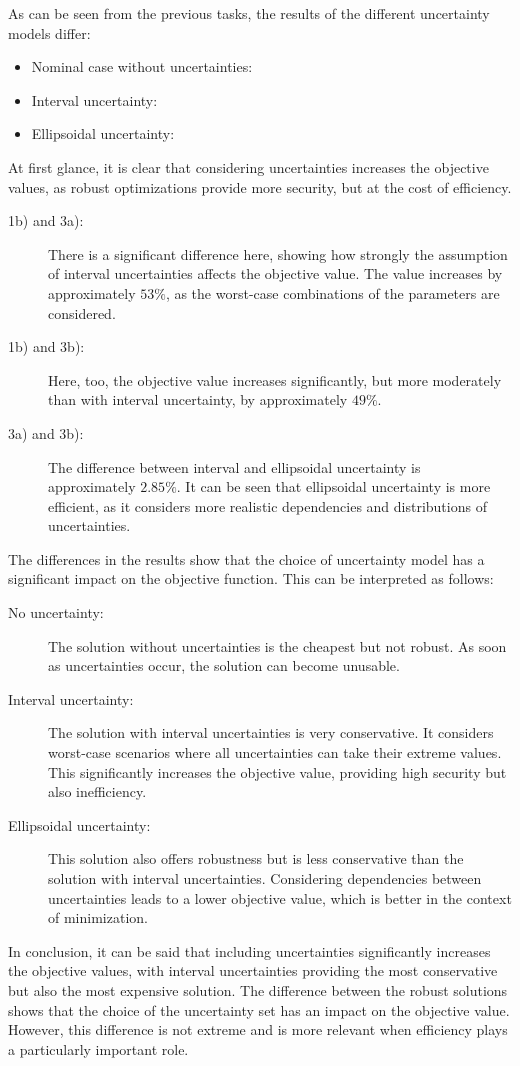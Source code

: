 \documentclass[a4paper,12pt]{article}
\begin{document}
As can be seen from the previous tasks, the results of the different uncertainty models differ:
\begin{itemize}
    \item Nominal case without uncertainties: 
    \item Interval uncertainty: 
    \item Ellipsoidal uncertainty: 
\end{itemize}
At first glance, it is clear that considering uncertainties increases the objective values, as robust optimizations provide more security, but at the cost of efficiency.
\begin{description}
    \item[1b) and 3a):] There is a significant difference here, showing how strongly the assumption of interval uncertainties affects the objective value. The value increases by approximately $53\%$, as the worst-case combinations of the parameters are considered.
    \item[1b) and 3b):] Here, too, the objective value increases significantly, but more moderately than with interval uncertainty, by approximately $49\%$.
    \item[3a) and 3b):] The difference between interval and ellipsoidal uncertainty is approximately $2.85\%$. It can be seen that ellipsoidal uncertainty is more efficient, as it considers more realistic dependencies and distributions of uncertainties.
\end{description}
The differences in the results show that the choice of uncertainty model has a significant impact on the objective function. This can be interpreted as follows:
\begin{description}
    \item[No uncertainty:] The solution without uncertainties is the cheapest but not robust. As soon as uncertainties occur, the solution can become unusable.
    \item[Interval uncertainty:] The solution with interval uncertainties is very conservative. It considers worst-case scenarios where all uncertainties can take their extreme values. This significantly increases the objective value, providing high security but also inefficiency.
    \item[Ellipsoidal uncertainty:] This solution also offers robustness but is less conservative than the solution with interval uncertainties. Considering dependencies between uncertainties leads to a lower objective value, which is better in the context of minimization.
\end{description}
In conclusion, it can be said that including uncertainties significantly increases the objective values, with interval uncertainties providing the most conservative but also the most expensive solution. The difference between the robust solutions shows that the choice of the uncertainty set has an impact on the objective value. However, this difference is not extreme and is more relevant when efficiency plays a particularly important role.
\end{document}
